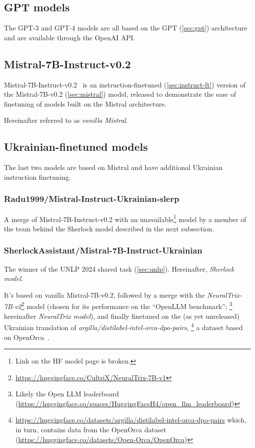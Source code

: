 \subsection{GPT models}
The GPT-3 and GPT-4 models are all based on the GPT (\autoref{sec:gpt}) architecture and are available through the OpenAI API. 

\subsection{Mistral-7B-Instruct-v0.2}
Mistral-7B-Instruct-v0.2~\cite{jiang_mistral_2023} is an instruction-finetuned (\autoref{sec:instruct-ft}) version of the Mistral-7B-v0.2 (\autoref{sec:mistral}) model, released to demonstrate the ease of finetuning of models built on the Mistral architecture. 

Hereinafter referred to as \textit{vanilla Mistral}.

\subsection{Ukrainian-finetuned models}
The last two models are based on Mistral and have additional Ukrainian instruction finetuning.

\subsubsection{Radu1999/Mistral-Instruct-Ukrainian-slerp} 
A merge of Mistral-7B-Instruct-v0.2 with an unavailable\footnote{Link on the HF model page is broken.} model by a member of the team behind the Sherlock model described in the next subsection.

\subsubsection{SherlockAssistant/Mistral-7B-Instruct-Ukrainian}
The winner of the UNLP 2024 shared task (\autoref{sec:unlp}). Hereinafter, \textit{Sherlock model}.

It's based on vanilla Mistral-7B-v0.2, followed by a merge with the \textit{NeuralTrix-7B-v2}\footnote{\href{https://huggingface.co/CultriX/NeuralTrix-7B-v1}{https://huggingface.co/CultriX/NeuralTrix-7B-v1}} model (chosen for its performance on the \enquote{OpenLLM benchmark};%
\footnote{Likely the Open LLM leaderboard 
(\href{https://huggingface.co/spaces/HuggingFaceH4/open_llm_leaderboard}{https://huggingface.co/spaces/HuggingFaceH4/open\_llm\_leaderboard})
} hereinafter \textit{NeuralTrix model}), 
and finally finetuned on the (as yet unreleased) Ukrainian translation of \textit{argilla/distilabel-intel-orca-dpo-pairs},%
\footnote{\href{https://huggingface.co/datasets/argilla/distilabel-intel-orca-dpo-pairs}{https://huggingface.co/datasets/argilla/distilabel-intel-orca-dpo-pairs} which, in turn, contains data from the OpenOrca dataset (\href{https://huggingface.co/datasets/Open-Orca/OpenOrca}{https://huggingface.co/datasets/Open-Orca/OpenOrca})}
a dataset based on OpenOrca~\cite{OpenOrca}.

